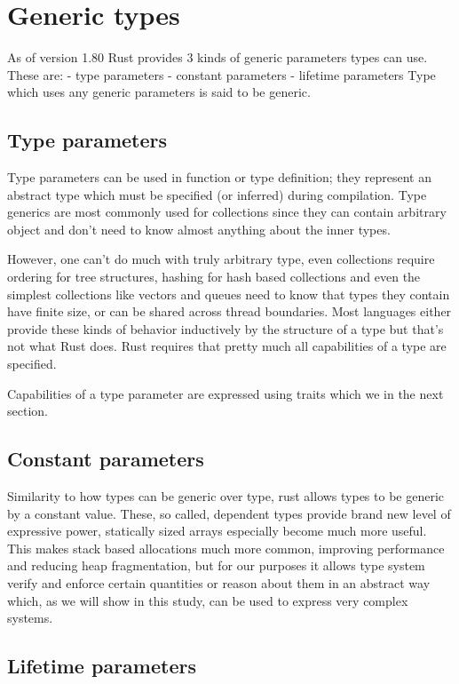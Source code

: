 \section{Generic types}

As of version 1.80 Rust provides 3 kinds of generic parameters types can use. 
These are:
- type parameters
- constant parameters
- lifetime parameters
Type which uses any generic parameters is said to be generic.

\subsection{Type parameters}

Type parameters can be used in function or type definition; they represent an abstract type which must be specified (or inferred) during compilation.
Type generics are most commonly used for collections since they can contain arbitrary object and don't need to know almost anything about the inner types.

However, one can't do much with truly arbitrary type, even collections require ordering for tree structures, hashing for hash based collections and even the simplest collections
like vectors and queues need to know that types they contain have finite size, or can be shared across thread boundaries. Most languages either provide these kinds of behavior
inductively by the structure of a type but that's not what Rust does. Rust requires that pretty much all capabilities of a type are specified.

Capabilities of a type parameter are expressed using traits which we in the next section.

\subsection{Constant parameters}

Similarity to how types can be generic over type, rust allows types to be generic by a constant value. These, so called, dependent types
provide brand new level of expressive power, statically sized arrays especially become much more useful. This makes stack based allocations much more common,
improving performance and reducing heap fragmentation, but for our purposes it allows type system verify and enforce certain quantities or reason about them in an abstract 
way which, as we will show in this study, can be used to express very complex systems.

\subsection{Lifetime parameters}

